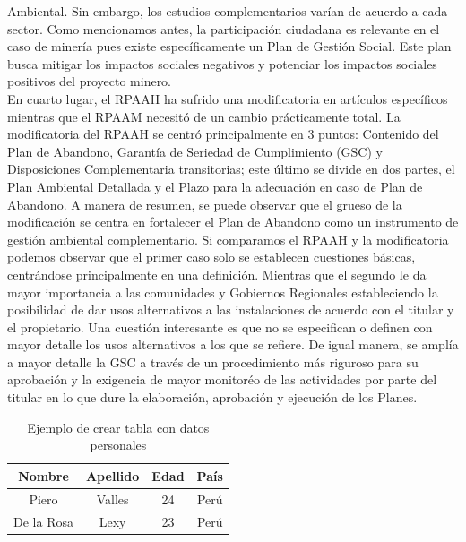 \documentclass[12pt, a4paper]{article} %
\newcommand{\celda}[1]{
    \begin{minipage}{2.5cm}
    \vspace{2mm}
    #1
    \vspace{2mm-}
    \end{minipage}
}
\begin{document}
\begin{multicols}{2}
Ambiental. Sin embargo, los estudios complementarios varían de acuerdo a cada sector. Como mencionamos antes, la participación ciudadana es relevante en el caso de minería pues existe específicamente un Plan de Gestión Social. Este plan busca mitigar los impactos sociales negativos y potenciar los impactos sociales positivos del proyecto minero. \\En cuarto lugar, el RPAAH ha sufrido una modificatoria en artículos específicos mientras que el RPAAM necesitó de un cambio prácticamente total. La modificatoria del RPAAH se centró principalmente en 3 puntos: Contenido del Plan de Abandono, Garantía de Seriedad de Cumplimiento (GSC) y Disposiciones Complementaria transitorias; este último se divide en dos partes, el Plan Ambiental Detallada y el Plazo para la adecuación en caso de Plan de Abandono. A manera de resumen, se puede observar que el grueso de la modificación se centra en fortalecer el Plan de Abandono como un instrumento de gestión ambiental complementario. Si comparamos el RPAAH y la modificatoria podemos observar que el primer caso solo se establecen cuestiones básicas, centrándose principalmente en una definición. Mientras que el segundo le da mayor importancia a las comunidades y Gobiernos Regionales estableciendo la posibilidad de dar usos alternativos a las instalaciones de acuerdo con el titular y el propietario. Una cuestión interesante es que no se especifican o definen con mayor detalle los usos alternativos a los que se refiere. De igual manera, se amplía a mayor detalle la GSC a través de un procedimiento más riguroso para su aprobación y la exigencia de mayor monitoréo de las actividades por parte del titular en lo que dure la elaboración, aprobación y ejecución de los Planes.
        \end{multicols}
        
         \begin{table}[H]  %
                \centering
                \begin{tabular}{cccc}  %
                \hline                 
                \celda{Nombre} \vline & \celda{Apellido} & \celda{Edad} & \celda{País} \\  
                \hline 
                \celda{Piero} \vline & \celda{Valles} & \celda{24} & \celda{Perú}\\
                \hline
                \celda{De la Rosa} \vline & \celda{Lexy} & \celda{23} & \celda{Perú}\\
                \hline                
                \end{tabular}
                \caption{Ejemplo de crear tabla con datos personales}
                \label{tab:tabla1}
            \end{table}
        
\end{document}
